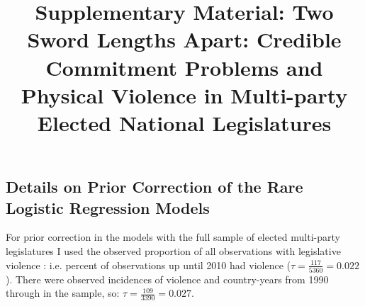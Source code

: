 \documentclass[a4paper]{article}\usepackage[]{graphicx}\usepackage[]{color}
\title{Supplementary Material: Two Sword Lengths Apart: Credible Commitment Problems and Physical Violence in Multi-party Elected National Legislatures}
\begin{document}
\maketitle






\subsection*{Details on Prior Correction of the Rare Logistic Regression Models}

For prior correction \citep[see][]{KingRareEventsPA2001} in the models with the full sample of elected multi-party legislatures I used the observed proportion of all observations with legislative violence : i.e.  percent of observations up until 2010 had violence ($\tau = \frac{117}{5360} = 0.022$). There were  observed incidences of violence and  country-years from 1990 through  in the sample, so: $\tau = \frac{109}{3390} = 0.027$.
\end{document}
